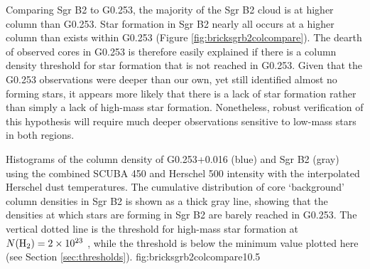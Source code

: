 \documentclass[twocolumn]{aastex61}
\begin{document}
Comparing Sgr B2 to G0.253, the majority of the Sgr B2 cloud is at higher
column than G0.253.  Star formation in Sgr B2 nearly all occurs
at a higher column than exists within G0.253 (Figure
\ref{fig:bricksgrb2colcompare}).  The dearth of observed cores in G0.253 is
therefore easily explained if there is a column density threshold for star
formation that is not reached in G0.253.  Given that the G0.253 observations
were deeper than our own, yet still identified almost no forming stars, it
appears more likely that there is a lack of star formation rather than simply a
lack of high-mass star formation.  Nonetheless, robust verification of this
hypothesis will require much deeper observations sensitive to low-mass stars
in both regions.

{Histograms of the column density of G0.253+0.016 (blue) and Sgr B2 (gray)
using the combined SCUBA 450 \um and Herschel 500 \um intensity with the
interpolated Herschel dust temperatures.  The cumulative distribution of core
`background' column densities in Sgr B2 is shown as a thick gray line, showing
that the densities at which stars are forming in Sgr B2 are barely
reached in G0.253.  The vertical dotted line is the \citet{Krumholz2008a}
threshold for high-mass star formation at $N(\textrm{H}_{2})=2\times10^{23}$ \persc, while
the \citet{Lada2010a} threshold is below the minimum value plotted here (see
Section \ref{sec:thresholds}).}
{fig:bricksgrb2colcompare}{1}{0.5\textwidth}

% 
% 
\end{document}
